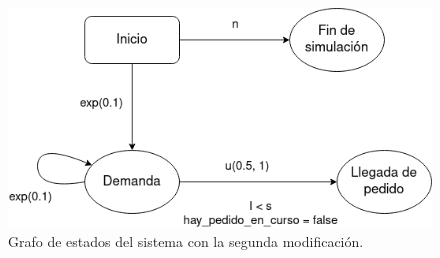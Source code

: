 \documentclass[12pt, spanish]{article}
\begin{document}
\begin{figure}[H]
  \centering
   \includegraphics[width=\textwidth]{grafo_sucesos_mod2.png}
	\caption{Grafo de estados del sistema con la segunda modificación.}
\end{figure}
\end{document}
